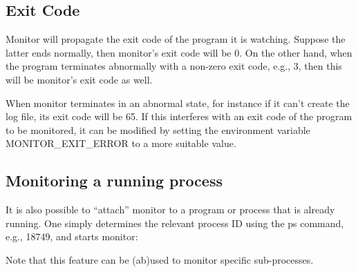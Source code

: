   \subsection{Exit Code}

  Monitor will propagate the exit code of the program it is watching. Suppose the
  latter ends normally, then monitor's exit code will be 0. On the other hand,
  when the program terminates abnormally with a non-zero exit code, e.g., 3, then
  this will be monitor's exit code as well.

  When monitor terminates in an abnormal state, for instance if it can't
  create the log file, its exit code will be 65. If this interferes with an exit
  code of the program to be monitored, it can be modified by setting the
  environment variable MONITOR\_EXIT\_ERROR to a more suitable value.

  \subsection{Monitoring a running process}

  It is also possible to ``attach'' monitor to a program or process that is already
  running. One simply determines the relevant process ID using the ps command,
  e.g., 18749, and starts monitor:

\begin{prompt}
\end{prompt}

  Note that this feature can be (ab)used to monitor specific sub-processes.
\fi
